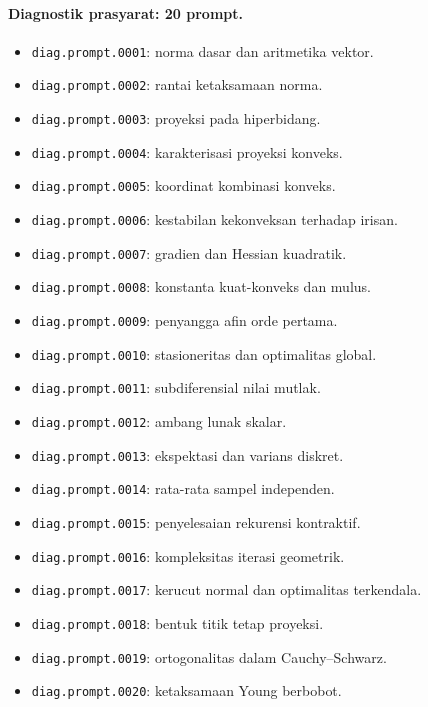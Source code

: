 \paragraph{Diagnostik prasyarat: 20 prompt.}
\begin{itemize}
\item \texttt{diag.prompt.0001}: norma dasar dan aritmetika vektor.
\item \texttt{diag.prompt.0002}: rantai ketaksamaan norma.
\item \texttt{diag.prompt.0003}: proyeksi pada hiperbidang.
\item \texttt{diag.prompt.0004}: karakterisasi proyeksi konveks.
\item \texttt{diag.prompt.0005}: koordinat kombinasi konveks.
\item \texttt{diag.prompt.0006}: kestabilan kekonveksan terhadap irisan.
\item \texttt{diag.prompt.0007}: gradien dan Hessian kuadratik.
\item \texttt{diag.prompt.0008}: konstanta kuat-konveks dan mulus.
\item \texttt{diag.prompt.0009}: penyangga afin orde pertama.
\item \texttt{diag.prompt.0010}: stasioneritas dan optimalitas global.
\item \texttt{diag.prompt.0011}: subdiferensial nilai mutlak.
\item \texttt{diag.prompt.0012}: ambang lunak skalar.
\item \texttt{diag.prompt.0013}: ekspektasi dan varians diskret.
\item \texttt{diag.prompt.0014}: rata-rata sampel independen.
\item \texttt{diag.prompt.0015}: penyelesaian rekurensi kontraktif.
\item \texttt{diag.prompt.0016}: kompleksitas iterasi geometrik.
\item \texttt{diag.prompt.0017}: kerucut normal dan optimalitas terkendala.
\item \texttt{diag.prompt.0018}: bentuk titik tetap proyeksi.
\item \texttt{diag.prompt.0019}: ortogonalitas dalam Cauchy--Schwarz.
\item \texttt{diag.prompt.0020}: ketaksamaan Young berbobot.
\end{itemize}

